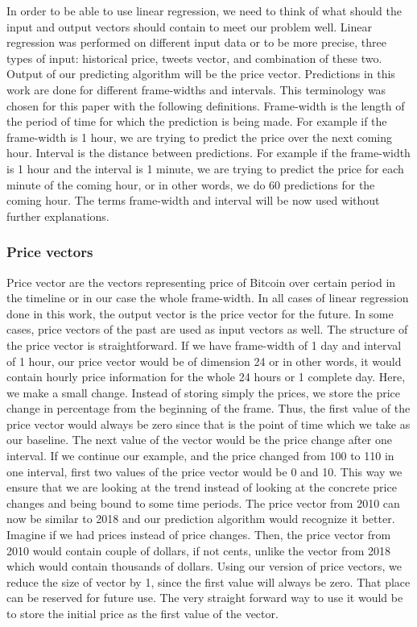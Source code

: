 \documentclass[a4paper,11pt,oneside]{article}
\begin{document}
  In order to be able to use linear regression, we need to think of what should the input and output vectors should contain to meet our problem well. Linear regression was performed on different input data or to be more precise, three types of input: historical price, tweets vector, and combination of these two. Output of our predicting algorithm will be the price vector. Predictions in this work are done for different frame-widths and intervals. This terminology was chosen for this paper with the following definitions. Frame-width is the length of the period of time for which the prediction is being made. For example if the frame-width is 1 hour, we are trying to predict the price over the next coming hour. Interval is the distance between predictions. For example if the frame-width is 1 hour and the interval is 1 minute, we are trying to predict the price for each minute of the coming hour, or in other words, we do 60 predictions for the coming hour. The terms frame-width and interval will be now used without further explanations. 
  
  \subsubsection{Price vectors}
  
  Price vector are the vectors representing price of Bitcoin over certain period in the timeline or in our case the whole frame-width. In all cases of linear regression done in this work, the output vector is the price vector for the future. In some cases, price vectors of the past are used as input vectors as well. The structure of the price vector is straightforward. If we have frame-width of 1 day and interval of 1 hour, our price vector would be of dimension 24 or in other words, it would contain hourly price information for the whole 24 hours or 1 complete day. Here, we make a small change. Instead of storing simply the prices, we store the price change in percentage from the beginning of the frame. Thus, the first value of the price vector would always be zero since that is the point of time which we take as our baseline. The next value of the vector would be the price change after one interval. If we continue our example, and the price changed from 100 to 110 in one interval, first two values of the price vector would be 0 and 10. This way we ensure that we are looking at the trend instead of looking at the concrete price changes and being bound to some time periods. The price vector from 2010 can now be similar to 2018 and our prediction algorithm would recognize it better. Imagine if we had prices instead of price changes. Then, the price vector from 2010 would contain couple of dollars, if not cents, unlike the vector from 2018 which would contain thousands of dollars. Using our version of price vectors, we reduce the size of vector by 1, since the first value will always be zero. That place can be reserved for future use. The very straight forward way to use it would be to store the initial price as the first value of the vector.
  
\end{document}
